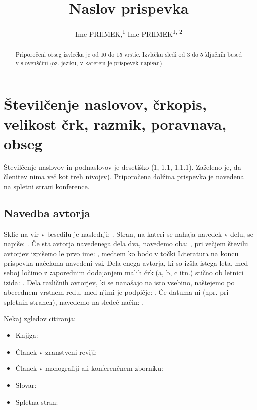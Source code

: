 \documentclass{article}
\title{Naslov prispevka}
\author{
  Ime PRIIMEK,\textsuperscript{1} Ime PRIIMEK\textsuperscript{1, 2}
}
\begin{document}
\maketitle

\begin{abstract}
Priporočeni obseg izvlečka je od 10 do 15 vrstic. Izvlečku sledi od 3 do 5 ključnih besed v slovenščini (oz. jeziku, v katerem je prispevek napisan).
\end{abstract}


\section{Številčenje naslovov, črkopis, velikost črk, razmik, poravnava, obseg}
Številčenje naslovov in podnaslovov je desetiško (1, 1.1, 1.1.1). Zaželeno je, da členitev nima več kot treh nivojev). Priporočena dolžina prispevka je navedena na spletni strani konference.


\subsection{Navedba avtorja}
Sklic na vir v besedilu je naslednji: \cite{leech1992corpora}. Stran, na kateri se nahaja navedek v delu, se napiše: \cite[str.~107]{leech1992corpora}. Če sta avtorja navedenega dela dva, navedemo oba: \cite{studije2005korpusnem}, pri večjem številu avtorjev izpišemo le prvo ime: \cite{biber1998corpus}, medtem ko bodo v točki Literatura na koncu prispevka načeloma navedeni vsi. Dela enega avtorja, ki so izšla istega leta, med seboj ločimo z zaporednim dodajanjem malih črk (a, b, c itn.) stično ob letnici izida: \cite{erjavec-multext}. Dela različnih avtorjev, ki se nanašajo na isto vsebino, naštejemo po abecednem vrstnem redu, med njimi je podpičje: \cite{erjavec-infotheca, tei}. Če datuma ni (npr. pri spletnih straneh), navedemo na sledeč način: \cite{creativecommons}. 

Nekaj zgledov citiranja:

    \begin{itemize}
        \item Knjiga: \cite{biber1998corpus, studije2005korpusnem}
        \item Članek v znanstveni reviji: \cite{biber1996investigating, erjavec-infotheca}
        \item Članek v monografiji ali konferenčnem zborniku: \cite{leech1992corpora, erjavec-multext}
        \item Slovar: \cite{sinclair1987collins, sskj}
        \item Spletna stran: \cite{openwebspider, creativecommons, scott2008wordsmith, tei}
    \end{itemize}
\end{document}
